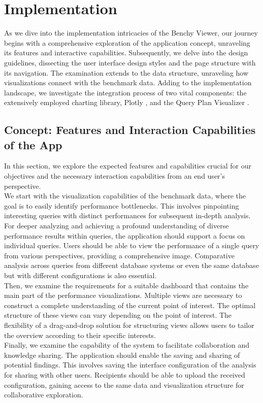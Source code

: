 
\chapter{Implementation}\label{chapter:implementation}

As we dive into the implementation intricacies of the Benchy Viewer, our journey begins with a comprehensive exploration of the application concept, unraveling its features and interactive capabilities. Subsequently, we delve into the design guidelines, dissecting the user interface design styles and the page structure with its navigation. The examination extends to the data structure, unraveling how visualizations connect with the benchmark data. Adding to the implementation landscape, we investigate the integration process of two vital components: the extensively employed charting library, Plotly \parencite*{plotly}, and the Query Plan Visualizer \parencite*{semantic-diff}. 

\section{Concept: Features and Interaction Capabilities of the App}
In this section, we explore the expected features and capabilities crucial for our objectives and the necessary interaction capabilities from an end user's perspective.\\
We start with the visualization capabilities of the benchmark data, where the goal is to easily identify performance bottlenecks. This involves pinpointing interesting queries with distinct performances for subsequent in-depth analysis.\\
For deeper analyzing and achieving a profound understanding of diverse performance results within queries, the application should support a focus on individual queries. Users should be able to view the performance of a single query from various perspectives, providing a comprehensive image. Comparative analysis across queries from different database systems or even the same database but with different configurations is also essential.\\ 
Then, we examine the requirements for a suitable dashboard that contains the main part of the performance visualizations. Multiple views are necessary to construct a complete understanding of the current point of interest. The optimal structure of these views can vary depending on the point of interest. The flexibility of a drag-and-drop solution for structuring views allows users to tailor the overview according to their specific interests.\\
Finally, we examine the capability of the system to facilitate collaboration and knowledge sharing. The application should enable the saving and sharing of potential findings. This involves saving the interface configuration of the analysis for sharing with other users. Recipients should be able to upload the received configuration, gaining access to the same data and visualization structure for collaborative exploration.


